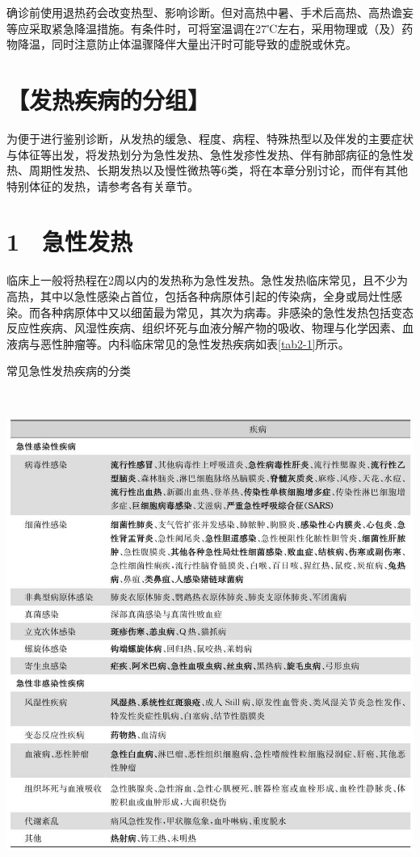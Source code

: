 确诊前使用退热药会改变热型、影响诊断。但对高热中暑、手术后高热、高热谵妄等应采取紧急降温措施。有条件时，可将室温调在27℃左右，采用物理或（及）药物降温，同时注意防止体温骤降伴大量出汗时可能导致的虚脱或休克。

\section{【发热疾病的分组】}

为便于进行鉴别诊断，从发热的缓急、程度、病程、特殊热型以及伴发的主要症状与体征等出发，将发热划分为急性发热、急性发疹性发热、伴有肺部病征的急性发热、周期性发热、长期发热以及慢性微热等6类，将在本章分别讨论，而伴有其他特别体征的发热，请参考各有关章节。

\protect\hypertarget{text00012.html}{}{}

\section{1　急性发热}

临床上一般将热程在2周以内的发热称为急性发热。急性发热临床常见，且不少为高热，其中以急性感染占首位，包括各种病原体引起的传染病，全身或局灶性感染。而各种病原体中又以细菌最为常见，其次为病毒。非感染的急性发热包括变态反应性疾病、风湿性疾病、组织坏死与血液分解产物的吸收、物理与化学因素、血液病与恶性肿瘤等。内科临床常见的急性发热疾病如表\ref{tab2-1}所示。

\begin{table}[htbp]
\centering
\caption{常见急性发热疾病的分类}
\label{tab2-1}
\includegraphics[width=5.92708in,height=6.28125in]{./images/Image00005.jpg}
\end{table}

